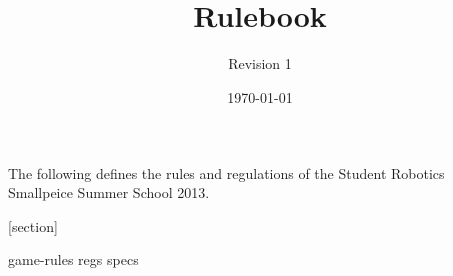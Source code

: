 \documentclass[a4paper, 11pt]{scrartcl}
\title {\compname \\ Rulebook}
\author{Revision 1}
\date{\today}
\newcommand{\compname}{Student Robotics Smallpeice Summer School 2013}
\begin{document}
\maketitle

\noindent The following defines the rules and regulations of the \compname.

[section]
\newcommand{\rcn}{\stepcounter{rule}\arabic{section}.\arabic{rule}}
\renewcommand{\labelenumi}{\rcn}

 {game-rules}
\newpage
 {regs}
\newpage
 {specs}

\renewcommand{\labelenumi}{\rcn}

\end{document}
